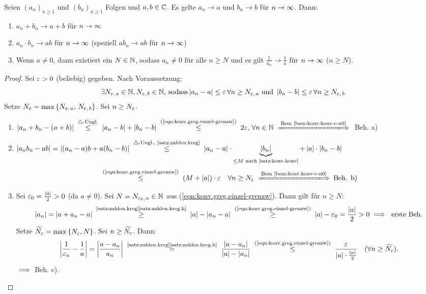 \documentclass[12pt]{scrreprt}
\begin{document}
\begin{satz}
  \label{satz:konv.greg}
  Seien $(a_n)_{n\ge1}$ und $(b_n)_{n\ge1}$ Folgen und $a, b \in
  \mathbb{C}$. Es gelte $a_n \to a$ und $b_n \to b$ für $n\rightarrow\infty$. Dann:
  \begin{enumerate}
  \item $a_n+b_n \to a+b$ für $n\rightarrow\infty$ \label{satz:konv.greg.a}
  \item $a_n \cdot b_n \to ab$ für $n\rightarrow\infty$ (speziell $ab_n \to ab$ für
    $n\rightarrow\infty$)\label{satz:konv.greg.b}
  \item Wenn $a\ne0$, dann existiert ein $N\in\mathbb{N}$, sodass $a_n\ne0$
    für alle $n \ge N$ und es gilt $\displaystyle\frac{1}{a_n}\to\frac{1}{a}$ für
    $n\rightarrow\infty$ ($n\ge N$). \label{satz:konv.greg.c}
  \end{enumerate}
\end{satz}
\begin{proof}
  Sei $\varepsilon>0$ (beliebig) gegeben. Nach Voraussetzung:
  \begin{equation}\label{eqn:konv.greg.einzel-grenzw} \exists
    N_{\varepsilon,\,a}\in\mathbb{N}, N_{\varepsilon,\,b}\in\mathbb{N} \text{, sodass}
    \left\lvert a_n-a\right\lvert\le\varepsilon\,\forall n\ge N_{\varepsilon,\,a} \text{ und }
    \left\lvert b_n-b\right\lvert\le\varepsilon\,\forall n\ge N_{\varepsilon,\,b} \end{equation}
  Setze $N_\varepsilon = \max{\{N_{\varepsilon,\,a},\,N_{\varepsilon,\,b}\}}$. Sei $n\ge N_\varepsilon$.
  \begin{enumerate}
  \item $\abs{a_n+b_n-(a+b)} \nach{\le}{$\triangle$-Ungl.}
    \abs{a_n-b}+\abs{b_n-b}
    \nach{\le}{(\ref{eqn:konv.greg.einzel-grenzw})} 2\ep,\,\forall
    \nat{n} \folgtnach{Bem~\ref{bem:konv.konv-c-n0}}$ Beh. a)
  \item $\displaystyle\abs{a_nb_n-ab} = \abs{(a_n-a)b+a(b_n-b)}
      \nach{\le}{$\triangle$-Ungl., \ref{satz:zahlen.kreg}}
      \abs{a_n-a}\cdot\underbrace{\abs{b_n}}_{\le M \text{ nach
          \ref{satz:konv.konv}}}+\abs{a}\cdot\abs{b_n-b}$
      \[\nach{\le}{(\ref{eqn:konv.greg.einzel-grenzw})}
      (M+\abs{a})\cdot\ep\quad\forall n\ge N_\ep
      \folgtnach{Bem~\ref{bem:konv.konv-c-n0}} \text{Beh. b)}\]
  \item Sei $\varepsilon_0=\frac{\left\lvert a\right\lvert}{2}>0$ (da $a\ne0$). Sei
    $N=N_{\varepsilon_0,\,a}\in\mathbb{N}$ aus
    (\ref{eqn:konv.greg.einzel-grenzw}). Dann gilt für $n\ge N$:
    \[\abs{a_n}=\abs{a+a_n-a}
    \nach{\ge}{\ref{satz:zahlen.kreg}\ref{satz:zahlen.kreg.h}}
    \abs{a}-\abs{a_n-a}
    \nach{\ge}{(\ref{eqn:konv.greg.einzel-grenzw})} \abs{a}-\ep_0 =
    \frac{\abs{a}}{2} > 0 \folgt\ \text{erste Beh.}\]
    Setze $\widetilde{N_\varepsilon} = \max{\{N_\varepsilon, N\}}$. Sei
    $n\ge\widetilde{N_\varepsilon}$. Dann:
    \[\abs{\frac{1}{\ep_n}-\frac{1}{a}} = \abs{\frac{a-a_n}{a_n}}
    \nach{=}{\ref{satz:zahlen.kreg}\ref{satz:zahlen.kreg.h}}
    \frac{\abs{a-a_n}}{\abs{a}-\abs{a_n}}
    \nach{\le}{(\ref{eqn:konv.greg.einzel-grenzw})}
    \frac{\ep}{\abs{a}\cdot\frac{\abs{a}}{2}} \quad(\forall
    n\ge\widetilde{N_\ep}).\]
    $\implies$ Beh. c).
  \end{enumerate}
\end{proof}
\end{document}
